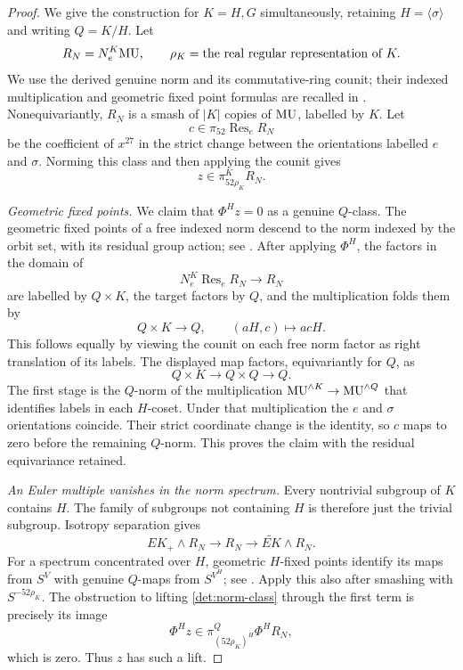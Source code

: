 \begin{proof}
We give the construction for \(K=H,G\) simultaneously, retaining
\(H=\langle\sigma\rangle\) and writing \(Q=K/H\).
Let
\[
 R_N=N_e^K\mathrm{MU},\qquad \rho_K=\text{the real regular representation of }K .
\]
We use the derived genuine norm and its commutative-ring
counit; their indexed multiplication and geometric fixed
point formulas are recalled in \cite[Section~2 and
Appendix~B]{HHR2016}.
Nonequivariantly, \(R_N\) is a smash of \(|K|\) copies of
\(\mathrm{MU}\), labelled by \(K\).
Let
\[
 c\in\pi_{52}\operatorname{Res}_eR_N
\]
be the coefficient of \(x^{27}\) in the strict change between
the orientations labelled \(e\) and \(\sigma\).
Norming this class and then applying the counit gives
\begin{equation}\label{det:norm-class}
 z\in\pi_{52\rho_K}^K R_N.
\end{equation}

\emph{Geometric fixed points.}
We claim that \(\Phi^H z=0\) as a genuine \(Q\)-class.
The geometric fixed points of a free indexed norm descend
to the norm indexed by the orbit set, with its residual group action;
see \cite[Corollary~2.11]{MSZNorms}.
After applying \(\Phi^H\), the factors in the domain of
\[
 N_e^K\operatorname{Res}_eR_N\longrightarrow R_N
\]
are labelled by \(Q\times K\), the target factors by \(Q\),
and the multiplication folds them by
\[
 Q\times K\longrightarrow Q,\qquad (aH,c)\longmapsto acH .
\]
This follows equally by viewing the counit on each free
norm factor as right translation of its labels.
The displayed map factors, equivariantly for \(Q\), as
\[
 Q\times K\longrightarrow Q\times Q\longrightarrow Q.
\]
The first stage is the \(Q\)-norm of the multiplication
\(\mathrm{MU}^{\wedge K}\to\mathrm{MU}^{\wedge Q}\) that identifies labels
in each \(H\)-coset.  Under that multiplication the \(e\)
and \(\sigma\) orientations coincide.
Their strict coordinate change is the identity, so \(c\)
maps to zero before the remaining \(Q\)-norm.
This proves the claim with the residual equivariance retained.

\emph{An Euler multiple vanishes in the norm spectrum.}
Every nontrivial subgroup of \(K\) contains \(H\).
The family of subgroups not containing \(H\) is therefore
just the trivial subgroup.  Isotropy separation gives
\[
 EK_+\wedge R_N\longrightarrow R_N
             \longrightarrow \widetilde{EK}\wedge R_N .
\]
For a spectrum concentrated over \(H\), geometric \(H\)-fixed
points identify its maps from \(S^V\) with genuine \(Q\)-maps
from \(S^{V^H}\); see \cite[Section~2.4]{GreenleesShipley}.
Apply this also after smashing with \(S^{-52\rho_K}\).
The obstruction to lifting \eqref{det:norm-class} through
the first term is precisely its image
\[
 \Phi^H z\in
 \pi_{(52\rho_K)^H}^{Q}\Phi^H R_N,
\]
which is zero.  Thus \(z\) has such a lift.


\end{proof}
